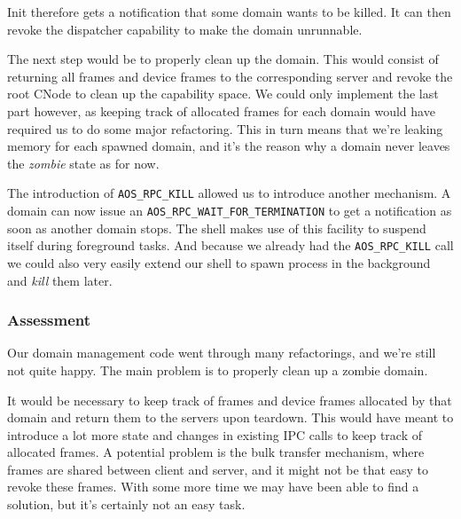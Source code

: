\documentclass[a4paper,10pt]{article}
\begin{document}
Init therefore gets a notification that some domain wants to be killed.
It can then revoke the dispatcher capability to make the domain unrunnable.

The next step would be to properly clean up the domain.
This would consist of returning all frames and device frames to the corresponding server and revoke the root CNode to clean up the capability space.
We could only implement the last part however, as keeping track of allocated frames for each domain would have required us to do some major refactoring.
This in turn means that we're leaking memory for each spawned domain, and it's the reason why a domain never leaves the \emph{zombie} state as for now.

The introduction of \lstinline!AOS_RPC_KILL! allowed us to introduce another mechanism.
A domain can now issue an \lstinline!AOS_RPC_WAIT_FOR_TERMINATION! to get a notification as soon as another domain stops.
The shell makes use of this facility to suspend itself during foreground tasks.
And because we already had the \lstinline!AOS_RPC_KILL! call we could also very easily extend our shell to spawn process in the background and \emph{kill} them later.

\subsubsection{Assessment}
Our domain management code went through many refactorings, and we're still not quite happy.
The main problem is to properly clean up a zombie domain.

It would be necessary to keep track of frames and device frames allocated by that domain and return them to the servers upon teardown.
This would have meant to introduce a lot more state and changes in existing IPC calls to keep track of allocated frames.
A potential problem is the bulk transfer mechanism, where frames are shared between client and server, and it might not be that easy to revoke these frames.
With some more time we may have been able to find a solution, but it's certainly not an easy task.

\end{document}
